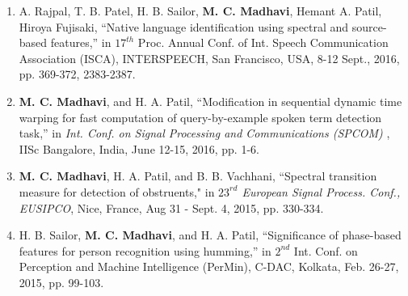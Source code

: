 \documentclass[10pt]{article}
\begin{document}
\begin{enumerate}[resume]
\item A. Rajpal, T. B. Patel, H. B. Sailor, \textbf{M. C. Madhavi}, Hemant A. Patil, Hiroya Fujisaki, ``Native language identification using spectral and source-based features,''  in $ 17^{th} $ Proc. Annual  Conf. of Int. Speech Communication Association (ISCA), INTERSPEECH, San Francisco, USA, 8-12 Sept., 2016, pp. 369-372,  2383-2387.

\item 	\textbf{M. C. Madhavi}, and H. A. Patil, ``Modification in sequential dynamic time warping for fast computation of query-by-example spoken term detection task,''  in \textit{Int. Conf. on Signal Processing and Communications (SPCOM)} , IISc Bangalore, India, June 12-15, 2016, pp. 1-6.

\item \textbf{M. C. Madhavi}, H. A. Patil, and B. B. Vachhani, ``Spectral transition measure for detection of obstruents," in \textit{$23^{rd}$ European
Signal Process. Conf., EUSIPCO}, Nice, France, Aug 31 - Sept. 4, 2015, pp. 330-334.

\item H. B. Sailor, \textbf{M. C. Madhavi}, and H. A. Patil, ``Significance of phase-based features for person recognition using humming,'' in $2^{nd}$ Int. Conf. on Perception and Machine Intelligence (PerMin), C-DAC, Kolkata, Feb. 26-27, 2015, pp. 99-103. 


\end{enumerate}
\end{document}
